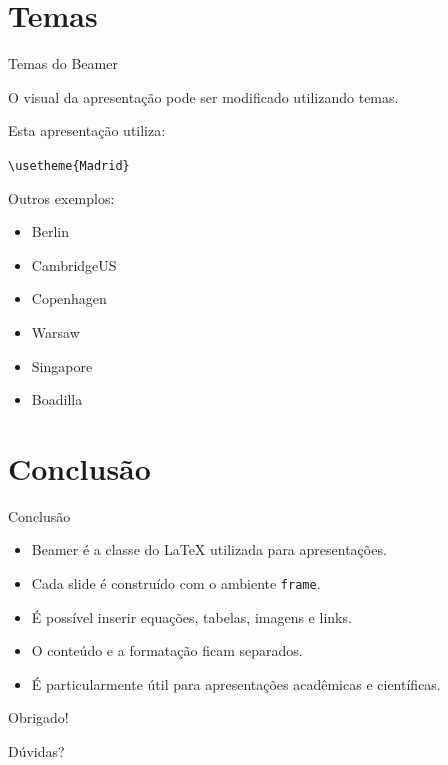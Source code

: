 \documentclass{beamer}
\begin{document}
\section{Temas}

\begin{frame}{Temas do Beamer}

    O visual da apresentação pode ser modificado utilizando temas.

    \vspace{0.3cm}

    Esta apresentação utiliza:

    \begin{center}
        \texttt{\textbackslash usetheme\{Madrid\}}
    \end{center}

    Outros exemplos:

    \begin{itemize}
        \item Berlin
        \item CambridgeUS
        \item Copenhagen
        \item Warsaw
        \item Singapore
        \item Boadilla
    \end{itemize}

\end{frame}

\section{Conclusão}

\begin{frame}{Conclusão}

    \begin{itemize}
        \item Beamer é a classe do LaTeX utilizada para apresentações.
        \item Cada slide é construído com o ambiente \texttt{frame}.
        \item É possível inserir equações, tabelas, imagens e links.
        \item O conteúdo e a formatação ficam separados.
        \item É particularmente útil para apresentações acadêmicas e científicas.
    \end{itemize}

\end{frame}


\begin{frame}
    \centering

    {\Huge Obrigado!}

    \vspace{0.8cm}

    {\Large Dúvidas?}
\end{frame}
\end{document}
